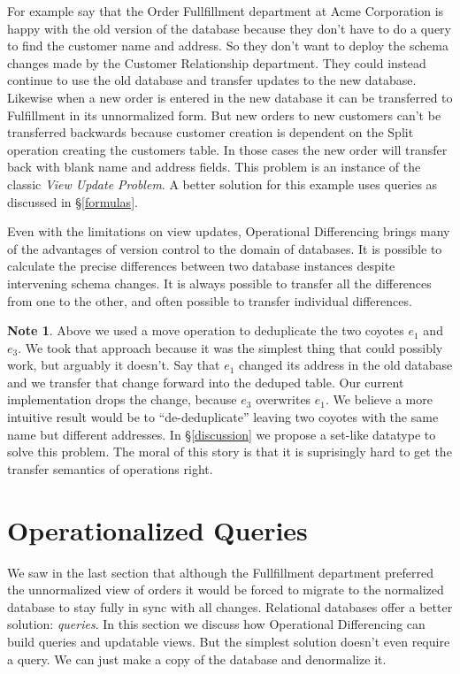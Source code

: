\documentclass[english,submission]{programming}
\theoremstyle{definition}
\newtheorem*{note}{Note}
\begin{document}
For example say that the Order Fullfillment department at Acme Corporation is happy with the old version of the database because they don't have to do a query to find the customer name and address. So they don't want to deploy the schema changes made by the Customer Relationship department. They could instead continue to use the old database and transfer updates to the new database. Likewise when a new order is entered in the new database it can be transferred to Fulfillment in its unnormalized form. But new orders to new customers can't be transferred backwards because customer creation is dependent on the \textsf{Split} operation creating the customers table. In those cases the new order will transfer back with blank name and address fields. This problem is an instance of the classic \textit{View Update Problem}\cite{Bancilhon81, Foster2007}. A better solution for this example uses queries as discussed in \S\ref{formulas}.

Even with the limitations on view updates, Operational Differencing brings many of the advantages of version control to the domain of databases. It is possible to calculate the precise differences between two database instances despite intervening schema changes. It is always possible to transfer all the differences from one to the other, and often possible to transfer individual differences.

\begin{note}
Above we used a \textsf{move} operation to deduplicate the two coyotes $e_1$ and $e_3$. We took that approach because it was the simplest thing that could possibly work, but arguably it doesn't. Say that $e_1$ changed its address in the old database and we transfer that change forward into the deduped table. Our current implementation drops the change, because $e_3$ overwrites $e_1$. We believe a more intuitive result would be to ``de-deduplicate''
leaving two coyotes with the same name but different addresses.
In \S\ref{discussion} we propose a set-like datatype to solve this problem.
The moral of this story is that it is suprisingly hard to get the transfer semantics of operations right.
\end{note}


\section{Operationalized Queries}

We saw in the last section that although the Fullfillment department preferred the unnormalized view of orders it would be forced to migrate to the normalized database to stay fully in sync with all changes. Relational databases offer a better solution: \textit{queries}. In this section we discuss how Operational Differencing can build queries and updatable views. But the simplest solution doesn't even require a query. We can just make a copy of the database and denormalize it.
\end{document}
